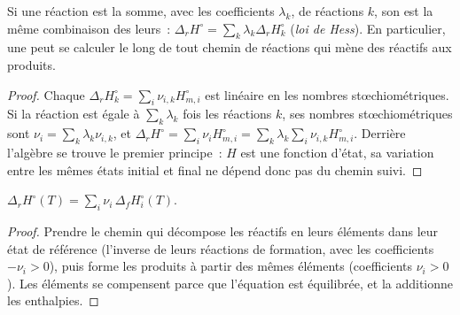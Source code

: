 \begin{theorem}\label{thm:b2:reaction-enthalpy:hess}
Si une réaction est la somme, avec les coefficients $\lambda_k$, de réactions $k$,
son  est la même combinaison des leurs~:
$\Delta_r H^\circ = \sum_k\lambda_k\Delta_r H_k^\circ$
(\emph{loi de Hess}). En particulier, une 
peut se calculer le long de tout chemin de réactions qui mène des
réactifs aux produits.
\end{theorem}

\begin{proof}
Chaque $\Delta_r H_k^\circ = \sum_i\nu_{i,k}H_{m,i}^\circ$ est linéaire en les
nombres stœchiométriques. Si la réaction est égale à $\sum_k\lambda_k$ fois les
réactions $k$, ses nombres stœchiométriques sont $\nu_i = \sum_k\lambda_k
\nu_{i,k}$, et $\Delta_r H^\circ = \sum_i\nu_iH_{m,i}^\circ = \sum_k\lambda_k
\sum_i\nu_{i,k}H_{m,i}^\circ$. Derrière l'algèbre se trouve le premier principe~: $H$ est une
fonction d'état, sa variation entre les mêmes états initial et final
ne dépend donc pas du chemin suivi.
\end{proof}

\begin{proposition}\label{prop:b2:reaction-enthalpy:formation-sum}
$\Delta_r H^\circ(T) = \sum_i\nu_i\,\Delta_f H_i^\circ(T)$.
\end{proposition}

\begin{proof}
Prendre le chemin qui décompose les réactifs en leurs éléments dans leur
état de référence (l'inverse de leurs réactions de formation, avec les
coefficients $-\nu_i > 0$), puis forme les produits à partir des mêmes éléments
(coefficients $\nu_i > 0$). Les éléments se compensent parce que l'équation est
équilibrée, et la  additionne les enthalpies.
\end{proof}

